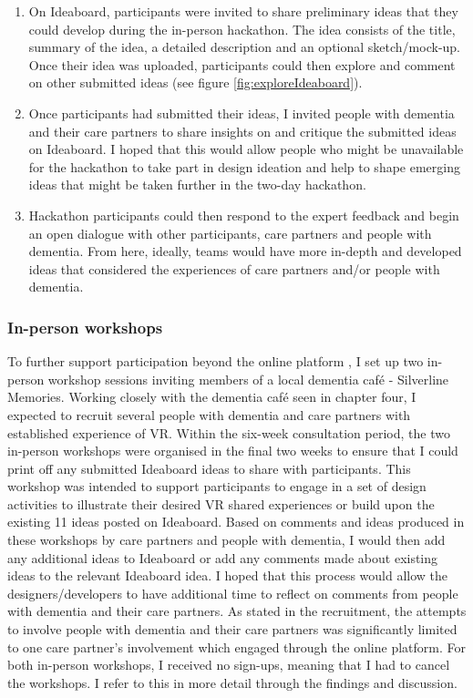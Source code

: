 \begin{enumerate}
    \item On Ideaboard, participants were invited to share preliminary ideas that they could develop during the in-person hackathon. The idea consists of the title, summary of the idea, a detailed description and an optional sketch/mock-up. Once their idea was uploaded, participants could then explore and comment on other submitted ideas  (see figure \ref{fig:exploreIdeaboard}).
    
    \item Once participants had submitted their ideas, I invited people with dementia and their care partners to share insights on and critique the submitted ideas on Ideaboard. I hoped that this would allow people who might be unavailable for the hackathon to take part in design ideation and help to shape emerging ideas that might be taken further in the two-day hackathon. 
    
    \item Hackathon participants could then respond to the expert feedback and begin an open dialogue with other participants, care partners and people with dementia. From here, ideally, teams would have more in-depth and developed ideas that considered the experiences of care partners and/or people with dementia. 
\end{enumerate}

\subsubsection{In-person workshops}
\label{sec:in-personWorkshops}
To further support participation beyond the online platform \citep{piper2016technological}, I set up two in-person workshop sessions inviting members of a local dementia café - Silverline Memories. Working closely with the dementia café seen in chapter four, I expected to recruit several people with dementia and care partners with established experience of VR. Within the six-week consultation period, the two in-person workshops were organised in the final two weeks to ensure that I could print off any submitted Ideaboard ideas to share with participants.  This workshop was intended to support participants to engage in a set of design activities to illustrate their desired VR shared experiences or build upon the existing 11 ideas posted on Ideaboard. Based on comments and ideas produced in these workshops by care partners and people with dementia, I would then add any additional ideas to Ideaboard or add any comments made about existing ideas to the relevant Ideaboard idea. I hoped that this process would allow the designers/developers to have additional time to reflect on comments from people with dementia and their care partners. As stated in the recruitment, the attempts to involve people with dementia and their care partners was significantly limited to one care partner’s involvement which engaged through the online platform. For both in-person workshops, I received no sign-ups, meaning that I had to cancel the workshops. I refer to this in more detail through the findings and discussion.

